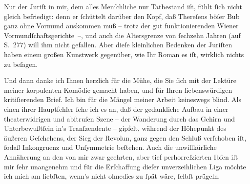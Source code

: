 \pstart
           {\pb}Nur der Juriſt in mir, dem alles
               Menſchliche nur Tatbestand iſt, fühlt{ }ſich nicht gleich befriedigt: denn er{ }ſchüttelt
               darüber den Kopf, daß Thereſens böſer Bub ganz ohne Vormund auskommen muß – trotz der gut
               funktionierenden Wiener Vormundſchaftsgerichte –,
               und auch die Altersgrenze von{ }ſechzehn Jahren (auf S. 277) will ihm nicht gefallen.
               Aber dieſe kleinlichen Bedenken der Juriſten haben einem großen Kunstwerk gegenüber,
               wie Ihr Roman es iſt, wirklich
               nichts zu beſagen.\pend
           
\pstart
           Und dann danke ich Ihnen herzlich für die Mühe, die Sie{ }ſich mit der Lektüre meiner
               korpulenten Komödie gemacht
               haben, und für Ihren liebenswürdigen kritiſierenden Brief. Ich bin für die Mängel
               meiner Arbeit keineswegs blind. Als einen ihrer Hauptfehler{ }ſehe ich es an, daß der
               gedankliche Aufbau in einer theaterwidrigen und abſtruſen Szene – der Wanderung durch
               das Gehirn {\pb}und Unterbewußtſein in’s
               Tranſzendente – gipfelt, während der Höhepunkt des äußeren Geſchehens, der Sieg der
                  Revolun, ganz gegen den Schluß verſchoben iſt,{ }ſodaß Inkongruenz und Unſymmetrie
               beſtehen. Auch die unwillkürliche Annäherung an den von mir zwar geehrten, aber tief
               perhorreſzierten Ibſen iſt mir{ }ſehr unangenehm
               und für die Erſchaffung dieſer unverzeihlichen Liga möchte ich mich am liebſten,
               wenn’s nicht ohnedies zu{ }ſpät wäre,{ }ſelbſt prügeln.\pend
           
